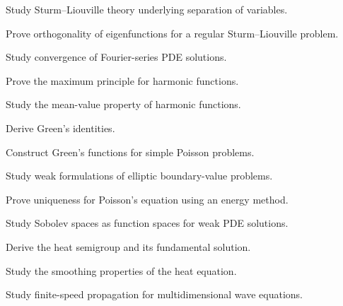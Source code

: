 \begin{exercise}[4]
Study Sturm--Liouville theory underlying separation of variables.
\end{exercise}

\begin{exercise}[4]
Prove orthogonality of eigenfunctions for a regular Sturm--Liouville
problem.
\end{exercise}

\begin{exercise}[4]
Study convergence of Fourier-series PDE solutions.
\end{exercise}

\begin{exercise}[4]
Prove the maximum principle for harmonic functions.
\end{exercise}

\begin{exercise}[4]
Study the mean-value property of harmonic functions.
\end{exercise}

\begin{exercise}[4]
Derive Green's identities.
\end{exercise}

\begin{exercise}[4]
Construct Green's functions for simple Poisson problems.
\end{exercise}

\begin{exercise}[4]
Study weak formulations of elliptic boundary-value problems.
\end{exercise}

\begin{exercise}[4]
Prove uniqueness for Poisson's equation using an energy method.
\end{exercise}

\begin{exercise}[4]
Study Sobolev spaces as function spaces for weak PDE solutions.
\end{exercise}

\begin{exercise}[4]
Derive the heat semigroup and its fundamental solution.
\end{exercise}

\begin{exercise}[4]
Study the smoothing properties of the heat equation.
\end{exercise}

\begin{exercise}[4]
Study finite-speed propagation for multidimensional wave equations.
\end{exercise}

